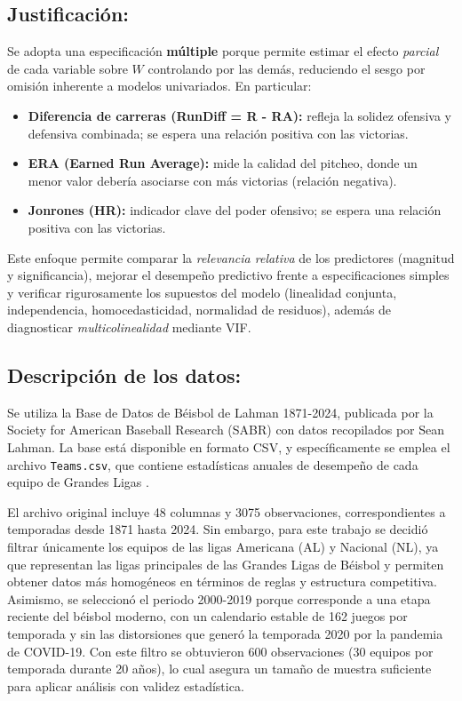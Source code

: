 \documentclass[man,floatsintext]{apa7}
\begin{document}
\subsection{Justificación:}
Se adopta una especificación \textbf{múltiple} porque permite estimar el efecto \emph{parcial} de cada variable sobre $W$ controlando por las demás, reduciendo el sesgo por omisión inherente a modelos univariados. En particular:
\begin{itemize}
    \item \textbf{Diferencia de carreras (RunDiff = R - RA):} refleja la solidez ofensiva y defensiva combinada; se espera una relación positiva con las victorias.
    \item \textbf{ERA (Earned Run Average):} mide la calidad del pitcheo, donde un menor valor debería asociarse con más victorias (relación negativa).
    \item \textbf{Jonrones (HR):} indicador clave del poder ofensivo; se espera una relación positiva con las victorias.
\end{itemize}
Este enfoque permite comparar la \emph{relevancia relativa} de los predictores (magnitud y significancia), mejorar el desempeño predictivo frente a especificaciones simples y verificar rigurosamente los supuestos del modelo (linealidad conjunta, independencia, homocedasticidad, normalidad de residuos), además de diagnosticar \emph{multicolinealidad} mediante VIF.
%
\subsection{Descripción de los datos:}
Se utiliza la Base de Datos de Béisbol de Lahman 1871-2024, publicada por la Society for American Baseball Research (SABR) con datos recopilados por Sean Lahman. La base está disponible en formato CSV, y específicamente se emplea el archivo \texttt{Teams.csv}, que contiene estadísticas anuales de desempeño de cada equipo de Grandes Ligas . 

El archivo original incluye 48 columnas y 3075 observaciones, correspondientes a temporadas desde 1871 hasta 2024. Sin embargo, para este trabajo se decidió filtrar únicamente los equipos de las ligas Americana (AL) y Nacional (NL), ya que representan las ligas principales de las Grandes Ligas de Béisbol y permiten obtener datos más homogéneos en términos de reglas y estructura competitiva. Asimismo, se seleccionó el periodo 2000-2019 porque corresponde a una etapa reciente del béisbol moderno, con un calendario estable de 162 juegos por temporada y sin las distorsiones que generó la temporada 2020 por la pandemia de COVID-19. Con este filtro se obtuvieron 600 observaciones (30 equipos por temporada durante 20 años), lo cual asegura un tamaño de muestra suficiente para aplicar análisis con validez estadística.
\end{document}
